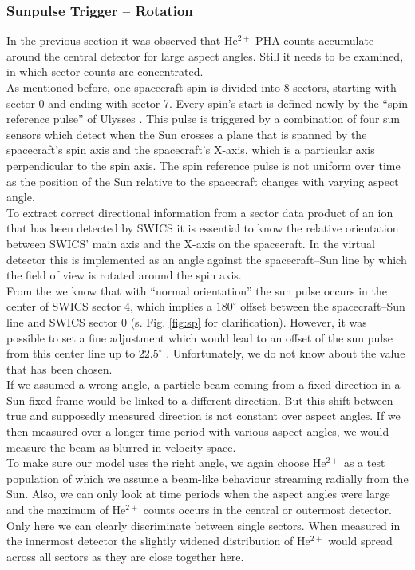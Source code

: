 \subsubsection{Sunpulse Trigger -- Rotation}
In the previous section it was observed that $\mathrm{He^{2+}}$ PHA counts accumulate around the central detector for large aspect angles. Still it needs to be examined, in which sector counts are concentrated.\\
As mentioned before, one spacecraft spin is divided into 8 sectors, starting with sector 0 and ending with sector 7. Every spin's start is defined newly by the ``spin reference pulse'' of Ulysses \citep{hiscale}. This pulse is triggered by a combination of four sun sensors which detect when the Sun crosses a plane that is spanned by the spacecraft's spin axis and the spacecraft's X-axis, which is a particular axis perpendicular to the spin axis. The spin reference pulse is not uniform over time as the position of the Sun relative to the spacecraft changes with varying aspect angle.\\
To extract correct directional information from a sector data product of an ion that has been detected by SWICS it is essential to know the relative orientation between SWICS' main axis and the X-axis on the spacecraft. In the virtual detector this is implemented as an angle against the spacecraft--Sun line by which the field of view is rotated around the spin axis.\\
From the \citet[][S.20-22]{swics_dpu} we know that with ``normal orientation'' the sun pulse occurs in the center of SWICS sector 4, which implies a $180^\circ$ offset between the spacecraft--Sun line and SWICS sector 0 (s. Fig. \ref{fig:sp} for clarification). However, it was possible to set a fine adjustment which would lead to an offset of the sun pulse from this center line up to $22.5^\circ$ \citet[][S.48]{swics_dpu}. Unfortunately, we do not know about the value that has been chosen.
\\
If we assumed a wrong angle, a particle beam coming from a fixed direction in a Sun-fixed frame would be linked to a different direction. But this shift between true and supposedly measured direction is not constant over aspect angles. If we then measured over a longer time period with various aspect angles, we would measure the beam as blurred in velocity space.
\\
To make sure our model uses the right angle, we again choose $\mathrm{He^{2+}}$ as a test population of which we assume a beam-like behaviour streaming radially from the Sun. Also, we can only look at time periods when the aspect angles were large and the maximum of $\mathrm{He^{2+}}$ counts occurs in the central or outermost detector. Only here we can clearly discriminate between single sectors. When measured in the innermost detector the slightly widened distribution of $\mathrm{He^{2+}}$ would spread across all sectors as they are close together here.
